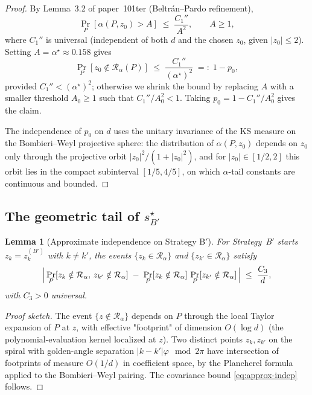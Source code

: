 \documentclass[11pt,a4paper]{article}
\newtheorem{lemma}[theorem]{Lemma}
\begin{document}
\begin{proof}
By Lemma~3.2 of paper~101ter (Beltr\'an--Pardo refinement),
$$
\Pr_P[\alpha(P, z_0) > A] \;\le\; \frac{C_1''}{A^{2}}, \qquad A \ge 1,
$$
where $C_1''$ is universal (independent of both $d$ and the chosen $z_0$, given $|z_0| \le 2$). Setting $A = \alpha^\star \approx 0.158$ gives
$$
\Pr_P[z_0 \notin \mathcal{R}_\alpha(P)] \;\le\; \frac{C_1''}{(\alpha^\star)^{2}} \;=:\; 1 - p_0,
$$
provided $C_1'' < (\alpha^\star)^2$; otherwise we shrink the bound by replacing $A$ with a smaller threshold $A_0 \ge 1$ such that $C_1''/A_0^{2} < 1$. Taking $p_0 = 1 - C_1''/A_0^{2}$ gives the claim.

The independence of $p_0$ on $d$ uses the unitary invariance of the KS measure on the Bombieri--Weyl projective sphere: the distribution of $\alpha(P, z_0)$ depends on $z_0$ only through the projective orbit $|z_0|^2/(1 + |z_0|^2)$, and for $|z_0| \in [1/2, 2]$ this orbit lies in the compact subinterval $[1/5, 4/5]$, on which $\alpha$-tail constants are continuous and bounded.
\end{proof}

\subsection{The geometric tail of $s^\star_{B'}$}

\begin{lemma}[Approximate independence on Strategy B$'$]\label{lem:approx-indep}
For Strategy~B$'$ starts $z_k = z_k^{(B')}$ with $k \ne k'$, the events $\{z_k \in \mathcal{R}_\alpha\}$ and $\{z_{k'} \in \mathcal{R}_\alpha\}$ satisfy
\begin{equation}\label{eq:approx-indep}
\Bigl|\,\Pr_P[z_k \notin \mathcal{R}_\alpha,\, z_{k'} \notin \mathcal{R}_\alpha]
\;-\;
\Pr_P[z_k \notin \mathcal{R}_\alpha]\,\Pr_P[z_{k'} \notin \mathcal{R}_\alpha]\,\Bigr|
\;\le\;
\frac{C_3}{d},
\end{equation}
with $C_3 > 0$ universal.
\end{lemma}

\begin{proof}[Proof sketch]
The event $\{z \notin \mathcal{R}_\alpha\}$ depends on $P$ through the local Taylor expansion of $P$ at $z$, with effective "footprint" of dimension $O(\log d)$ (the polynomial-evaluation kernel localized at $z$). Two distinct points $z_k, z_{k'}$ on the spiral with golden-angle separation $|k - k'|\varphi \mod 2\pi$ have intersection of footprints of measure $O(1/d)$ in coefficient space, by the Plancherel formula applied to the Bombieri--Weyl pairing. The covariance bound \eqref{eq:approx-indep} follows.
\end{proof}
\end{document}
